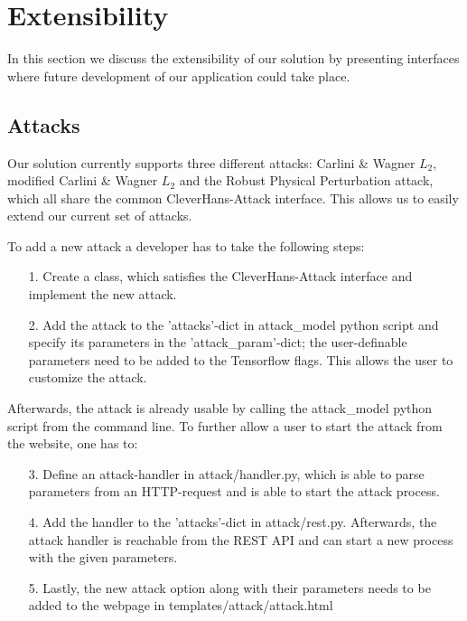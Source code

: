 
\section{Extensibility}\label{sec:extensibility}

In this section we discuss the extensibility of our solution by presenting interfaces where future development of our application could take place.

\subsection{Attacks}
Our solution currently supports three different attacks: Carlini \& Wagner $L_2$, modified Carlini \& Wagner $L_2$ and the Robust Physical Perturbation attack, which all share the common CleverHans-Attack interface. This allows us to easily extend our current set of attacks.

To add a new attack a developer has to take the following steps:

\begin{enumerate}
\item[1.] Create a class, which satisfies the CleverHans-Attack interface and implement the new attack.
\item[2.] Add the attack to the 'attacks'-dict in attack\_model python script and specify its parameters in the 'attack\_param'-dict; the user-definable parameters need to be added to the Tensorflow flags. This allows the user to customize the attack.
\end{enumerate}

Afterwards, the attack is already usable by calling the attack\_model python script from the command line. To further allow a user to start the attack from the website, one has to:

\begin{enumerate}
\item[3.] Define an attack-handler in attack/handler.py, which is able to parse parameters from an HTTP-request and is able to start the attack process.
\item[4.] Add the handler to the 'attacks'-dict in attack/rest.py. Afterwards, the attack handler is reachable from the REST API and can start a new process with the given parameters.
\item[5.] Lastly, the new attack option along with their parameters needs to be added to the webpage in templates/attack/attack.html
\end{enumerate}

